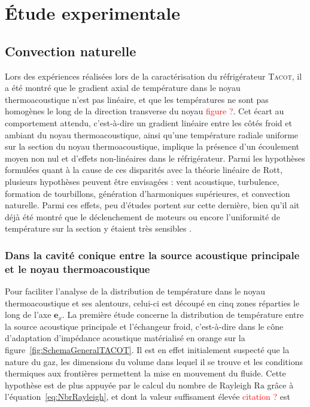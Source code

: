 \chapter{\'Etude experimentale}\label{chap:EtudeExpe}
\mylocaltoc

\section{Convection naturelle}\label{chap:EtudeExpe_ConvNat}
Lors des expériences réalisées lors de la caractérisation du réfrigérateur \textsc{Tacot}, il a été montré que le gradient axial de température dans le noyau thermoacoustique n'est pas linéaire, et que les températures ne sont pas homogènes le long de la direction transverse du noyau \textcolor{red}{figure ?}\cite{ramadan_design_2021}. Cet écart au comportement attendu, c'est-à-dire un gradient linéaire entre les côtés froid et ambiant du noyau thermoacoustique, ainsi qu'une température radiale uniforme sur la section du noyau thermoacoustique, implique la présence d'un écoulement moyen non nul et d'effets non-linéaires dans le réfrigérateur. Parmi les hypothèses formulées quant à la cause de ces disparités avec la théorie linéaire de Rott, plusieurs hypothèses peuvent être envisagées : vent acoustique, turbulence, formation de tourbillons, génération d'harmoniques supérieures, et convection naturelle. Parmi ces effets, peu d'études portent sur cette dernière, bien qu'il ait déjà été montré que le déclenchement de moteurs ou encore l'uniformité de température sur la section y étaient très sensibles \cite{ross_influence_2003,  hireche_numerical_2019, ramadan_experimental_2018,  zhang_novel_2011}.

\subsection{Dans la cavité conique entre la source acoustique principale et le noyau thermoacoustique}

Pour faciliter l'analyse de la distribution de température dans le noyau thermoacoustique et ses alentours, celui-ci est découpé en cinq zones réparties le long de l'axe $\mathbf{e}_x$.
La première étude concerne la distribution de température entre la source acoustique principale et l'échangeur froid, c'est-à-dire dans le cône d'adaptation d'impédance acoustique matérialisé en orange sur la figure~\ref{fig:SchemaGeneralTACOT}. Il est en effet initialement suspecté que la nature du gaz, les dimensions du volume dans lequel il se trouve et les conditions thermiques aux frontières permettent la mise en mouvement du fluide. Cette hypothèse est de plus appuyée par le calcul du nombre de Rayleigh $\mathrm{Ra}$ grâce à l'équation~\eqref{eq:NbrRayleigh}, et dont la valeur suffisament élevée \textcolor{red}{citation ?} est

